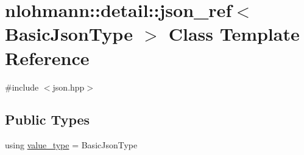 \hypertarget{classnlohmann_1_1detail_1_1json__ref}{}\section{nlohmann\+:\+:detail\+:\+:json\+\_\+ref$<$ Basic\+Json\+Type $>$ Class Template Reference}
\label{classnlohmann_1_1detail_1_1json__ref}


{\ttfamily \#include $<$json.\+hpp$>$}

\subsection*{Public Types}
\begin{DoxyCompactItemize}
\item 
using \hyperlink{classnlohmann_1_1detail_1_1json__ref_a78d76cf288141049568c0d670ed670ef}{value\+\_\+type} = Basic\+Json\+Type
\end{DoxyCompactItemize}
